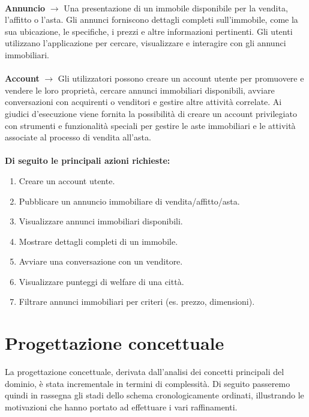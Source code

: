 \documentclass[a4paper,12pt]{report}
\begin{document}
        \\
        {\Large \textbf{Annuncio}} $\rightarrow$ Una presentazione di un immobile disponibile per la vendita, l'affitto o l'asta. Gli annunci forniscono dettagli completi sull'immobile, come la sua ubicazione, le specifiche, i prezzi e altre informazioni pertinenti. Gli utenti utilizzano l'applicazione per cercare, visualizzare e interagire con gli annunci immobiliari. \\
        \\
        {\Large \textbf{Account}} $\rightarrow$ Gli utilizzatori possono creare un account utente per promuovere e vendere le loro proprietà, cercare annunci immobiliari disponibili, avviare conversazioni con acquirenti o venditori e gestire altre attività correlate. Ai giudici d'esecuzione viene fornita la possibilità di creare un account privilegiato con strumenti e funzionalità speciali per gestire le aste immobiliari e le attività associate al processo di vendita all'asta. \\
        \\
        \textbf{Di seguito le principali azioni richieste:}
        
        \begin{enumerate}
        \item Creare un account utente.
        \item Pubblicare un annuncio immobiliare di vendita/affitto/asta.
        \item Visualizzare annunci immobiliari disponibili.
        \item Mostrare dettagli completi di un immobile.
        \item Avviare una conversazione con un venditore.
        \item Visualizzare punteggi di welfare di una città.
        \item Filtrare annunci immobiliari per criteri (es. prezzo, dimensioni).
        \end{enumerate}


	\chapter{Progettazione concettuale}
        La progettazione concettuale, derivata dall'analisi dei concetti principali del dominio,
        è stata incrementale in termini di complessità. Di seguito passeremo quindi in rassegna
        gli stadi dello schema cronologicamente ordinati, illustrando le motivazioni che hanno 
        portato ad effettuare i vari raffinamenti. 
\end{document}
